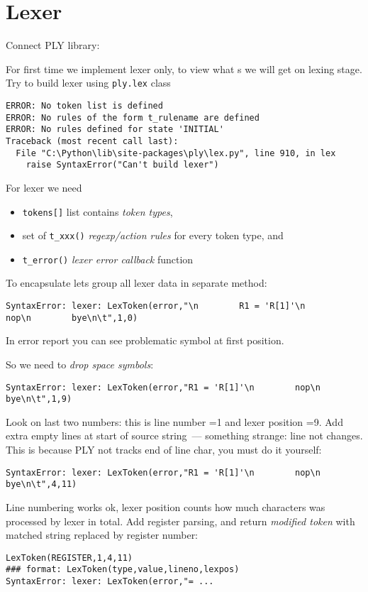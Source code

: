 \section{Lexer}

Connect PLY library:


For first time we implement lexer only, to view what s we will get
on lexing stage. Try to build lexer using \verb|ply.lex| class

\begin{lstlisting}
ERROR: No token list is defined
ERROR: No rules of the form t_rulename are defined
ERROR: No rules defined for state 'INITIAL'
Traceback (most recent call last):
  File "C:\Python\lib\site-packages\ply\lex.py", line 910, in lex
    raise SyntaxError("Can't build lexer")
\end{lstlisting}

For lexer we need 
\begin{itemize}
  \item \verb|tokens[]| list contains \emph{token types}, 
  \item set of \verb|t_xxx()| \emph{regexp/action rules} for every token type,
  and
  \item \verb|t_error()| \emph{lexer error callback} function 
\end{itemize}
To encapsulate lets group all lexer data in separate method:



\begin{lstlisting}
SyntaxError: lexer: LexToken(error,"\n        R1 = 'R[1]'\n        nop\n        bye\n\t",1,0)
\end{lstlisting}

In error report you can see problematic symbol at first position.

So we need to \emph{drop space symbols}:

\begin{lstlisting}
SyntaxError: lexer: LexToken(error,"R1 = 'R[1]'\n        nop\n        bye\n\t",1,9)
\end{lstlisting}
Look on last two numbers: this is line number =1 and lexer position =9. Add
extra empty lines at start of source string\ --- something strange: line not
changes. This is because PLY not tracks end of line char, you must do it
yourself:

\begin{lstlisting}
SyntaxError: lexer: LexToken(error,"R1 = 'R[1]'\n        nop\n       
bye\n\t",4,11)
\end{lstlisting}
Line numbering works ok, lexer position counts how much characters was processed
by lexer in total.
Add register parsing, and return \emph{modified token} with matched string
replaced by register number:

\begin{lstlisting}
LexToken(REGISTER,1,4,11)
### format: LexToken(type,value,lineno,lexpos)
SyntaxError: lexer: LexToken(error,"= ...
\end{lstlisting}

